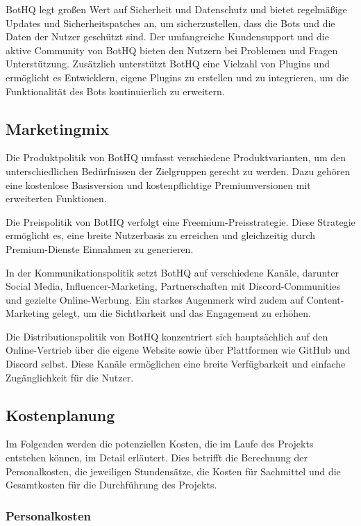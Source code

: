 BotHQ legt großen Wert auf Sicherheit und Datenschutz und bietet regelmäßige Updates und Sicherheitspatches an, um sicherzustellen, dass die Bots und die Daten der Nutzer geschützt sind. Der umfangreiche Kundensupport und die aktive Community von BotHQ bieten den Nutzern bei Problemen und Fragen Unterstützung. Zusätzlich unterstützt BotHQ eine Vielzahl von Plugins und ermöglicht es Entwicklern, eigene Plugins zu erstellen und zu integrieren, um die Funktionalität des Bots kontinuierlich zu erweitern.

\subsection{Marketingmix}\label{marketingmix}

Die Produktpolitik von BotHQ umfasst verschiedene Produktvarianten, um den unterschiedlichen Bedürfnissen der Zielgruppen gerecht zu werden. Dazu gehören eine kostenlose Basisversion und kostenpflichtige Premiumversionen mit erweiterten Funktionen.

Die Preispolitik von BotHQ verfolgt eine Freemium-Preisstrategie. Diese Strategie ermöglicht es, eine breite Nutzerbasis zu erreichen und gleichzeitig durch Premium-Dienste Einnahmen zu generieren. 

In der Kommunikationspolitik setzt BotHQ auf verschiedene Kanäle, darunter Social Media, Influencer-Marketing, Partnerschaften mit Discord-Communities und gezielte Online-Werbung. Ein starkes Augenmerk wird zudem auf Content-Marketing gelegt, um die Sichtbarkeit und das Engagement zu erhöhen.

Die Distributionspolitik von BotHQ konzentriert sich hauptsächlich auf den Online-Vertrieb über die eigene Website sowie über Plattformen wie GitHub und Discord selbst. Diese Kanäle ermöglichen eine breite Verfügbarkeit und einfache Zugänglichkeit für die Nutzer.

\subsection{Kostenplanung}\label{kostenplanung}

Im Folgenden werden die potenziellen Kosten, die im Laufe des Projekts entstehen können, im Detail erläutert. Dies betrifft die Berechnung der Personalkosten, die jeweiligen Stundensätze, die Kosten für Sachmittel und die Gesamtkosten für die Durchführung des Projekts.

\subsubsection{Personalkosten}\label{personalkosten}

